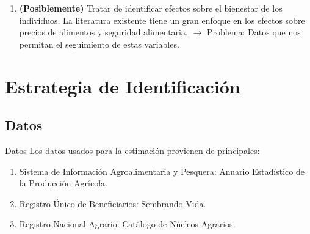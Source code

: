 \documentclass[10pt,usenames,dvipsnames]{beamer}
\begin{document}
\begin{frame}
\begin{enumerate}
\pause
\item \textbf{(Posiblemente)} Tratar de identificar efectos sobre el bienestar de los individuos. La literatura existente tiene un gran enfoque en los efectos sobre precios de alimentos y seguridad alimentaria. \pause $\to$ Problema: Datos que nos permitan el seguimiento de estas variables.
\end{enumerate}
\bigskip

\end{frame}



\section{Estrategia de Identificación}

\subsection{Datos}

\begin{frame}{Datos}
Los datos usados para la estimación provienen de  principales:\\
\bigskip
\begin{enumerate}
\item Sistema de Información Agroalimentaria y Pesquera: Anuario Estadístico de la Producción Agrícola.
\bigskip
\item Registro Único de Beneficiarios: Sembrando Vida.
\bigskip
\item Registro Nacional Agrario: Catálogo de Núcleos Agrarios.
\end{enumerate}
\end{frame}
\end{document}
